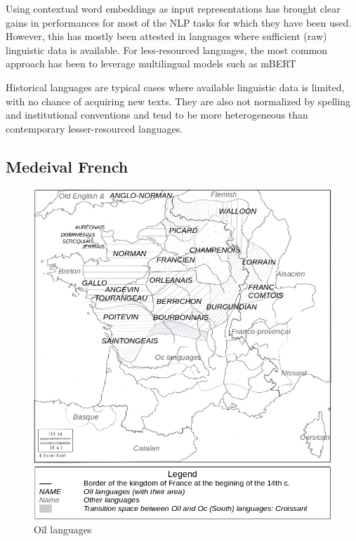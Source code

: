 Using contextual word embeddings as input representations has brought clear gains in performances for most of the NLP tasks for which they have been used.
However, this has mostly been attested in languages where sufficient (raw) linguistic data is available.
For less-resourced languages, the most common approach has been to leverage multilingual models such as mBERT \citep{devlin-etal-2019-bert}

Historical languages are typical cases where available linguistic data is limited, with no chance of acquiring new texts. They are also not normalized by spelling and institutional conventions and tend to be more heterogeneous than contemporary lesser-resourced languages.

\subsection{Medeival French}

\begin{figure}[thb]
  \centering
  \includegraphics[scale=0.29]{static/media/mod_eval/bertrade/map-dialects2.png}
  \caption{Oïl languages}
  \label{fig:map-dialects}
\end{figure}

